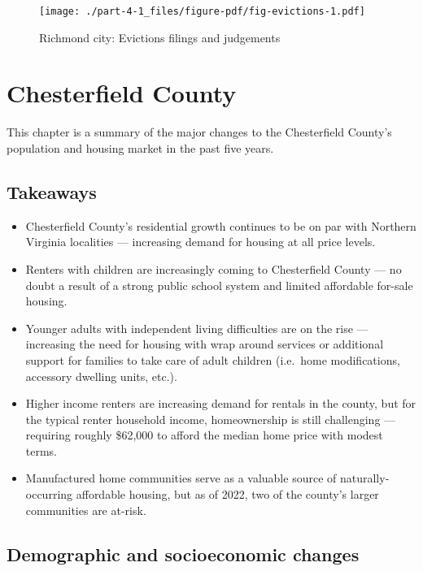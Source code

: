 \documentclass[
  letterpaper,
  DIV=11,
  numbers=noendperiod]{scrreprt}
\providecommand{\tightlist}{%
  \setlength{\itemsep}{0pt}\setlength{\parskip}{0pt}}\usepackage{longtable,booktabs,array}
\begin{document}
\begin{figure}

{\centering \texttt{[image: ./part-4-1\_files/figure-pdf/fig-evictions-1.pdf]}

}

\caption{\label{fig-evictions}Richmond city: Evictions filings and
judgements}

\end{figure}

\hypertarget{part-4-2}{%
\chapter{Chesterfield County}\label{part-4-2}}

This chapter is a summary of the major changes to the Chesterfield
County's population and housing market in the past five years.

\hypertarget{takeaways-1}{%
\section{Takeaways}\label{takeaways-1}}

\begin{itemize}
\tightlist
\item
  Chesterfield County's residential growth continues to be on par with
  Northern Virginia localities --- increasing demand for housing at all
  price levels.
\item
  Renters with children are increasingly coming to Chesterfield County
  --- no doubt a result of a strong public school system and limited
  affordable for-sale housing.
\item
  Younger adults with independent living difficulties are on the rise
  --- increasing the need for housing with wrap around services or
  additional support for families to take care of adult children
  (i.e.~home modifications, accessory dwelling units, etc.).
\item
  Higher income renters are increasing demand for rentals in the county,
  but for the typical renter household income, homeownership is still
  challenging --- requiring roughly \$62,000 to afford the median home
  price with modest terms.
\item
  Manufactured home communities serve as a valuable source of
  naturally-occurring affordable housing, but as of 2022, two of the
  county's larger communities are at-risk.
\end{itemize}

\hypertarget{demographic-and-socioeconomic-changes-1}{%
\section{Demographic and socioeconomic
changes}\label{demographic-and-socioeconomic-changes-1}}
\end{document}
